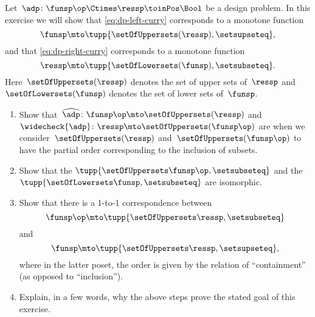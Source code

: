 \begin{gradedexercise}
    \label{ex:CurryingDesignProblems}
    Let~$\adp\colon \funsp\op \Ctimes \ressp\toinPos \Bool$ be a design problem.
    In this exercise we will show that \cref{eq:dp-left-curry} corresponds to a monotone function
    \begin{equation}
        \funsp \mto \tupp{\setOfUppersets (\ressp), \setsupseteq},
    \end{equation}
    and that \cref{eq:dp-right-curry} corresponds to a monotone function
    \begin{equation}
        \ressp \mto \tupp{\setOfLowersets(\funsp), \setsubseteq}.
    \end{equation}
    Here~$\setOfUppersets (\ressp)$ denotes the set of upper sets of~$\ressp$ and~$\setOfLowersets(\funsp)$ denotes the set of lower sets of~$\funsp$.

    \begin{enumerate}
        \item Show that~$\widehat{\adp} \colon \funsp\op \mto \setOfUppersets (\ressp)$ and~$\widecheck{\adp} \colon \ressp \mto \setOfUppersets (\funsp\op)$ are  when we consider~$\setOfUppersets (\ressp)$ and~$\setOfUppersets (\funsp\op)$ to have the partial order corresponding to the inclusion of subsets.
        \item Show that the  $\tupp{\setOfUppersets\funsp\op, \setsubseteq}$ and the  $\tupp{\setOfLowersets\funsp, \setsubseteq}$ are isomorphic.
        \item Show that there is a 1-to-1 correspondence between   \begin{equation}
                  \funsp\op \mto \tupp{\setOfUppersets \ressp, \setsubseteq}
              \end{equation}
              and   \begin{equation}
                  \funsp \mto \tupp{\setOfUppersets \ressp, \setsupseteq},
              \end{equation}
              where in the latter poset, the order is given by the relation of ``containment'' (as opposed to ``inclusion'').
        \item Explain, in a few words, why the above steps prove the stated goal of this exercise.
    \end{enumerate}
\end{gradedexercise}

